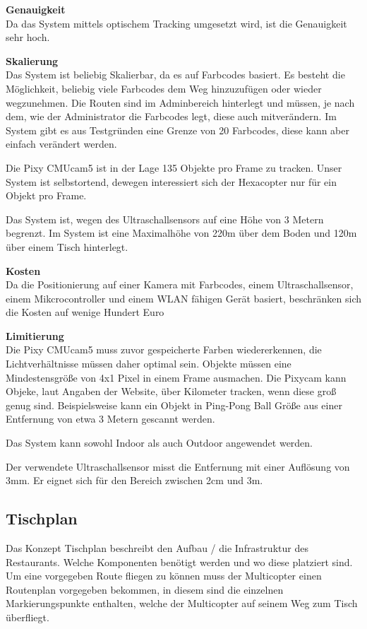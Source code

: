   \textbf{Genauigkeit}\\
  Da das System mittels optischem Tracking umgesetzt wird, ist die Genauigkeit sehr hoch.

  \textbf{Skalierung}\\
  Das System ist beliebig Skalierbar, da es auf Farbcodes basiert. Es besteht die Möglichkeit, beliebig viele Farbcodes dem Weg hinzuzufügen oder wieder wegzunehmen. Die Routen sind im Adminbereich hinterlegt und müssen, je nach dem, wie der Administrator die Farbcodes legt, diese auch mitverändern. Im System gibt es aus Testgründen eine Grenze von 20 Farbcodes, diese kann aber einfach verändert werden.

  Die Pixy CMUcam5 ist in der Lage 135 Objekte pro Frame zu tracken. Unser System ist selbstortend, dewegen interessiert sich der Hexacopter nur für ein Objekt pro Frame. \cite{PIXY_Porting_Examplecode}

  Das System ist, wegen des Ultraschallsensors auf eine Höhe von 3 Metern begrenzt. Im System ist eine Maximalhöhe von 220m über dem Boden und 120m über einem Tisch hinterlegt.

  \textbf{Kosten}\\
  Da  die Positionierung auf einer Kamera mit Farbcodes, einem Ultraschallsensor, einem Mikcrocontroller und einem WLAN fähigen Gerät basiert, beschränken sich die Kosten auf wenige Hundert Euro

  \textbf{Limitierung}\\
  Die Pixy CMUcam5 muss zuvor gespeicherte Farben wiedererkennen, die Lichtverhältnisse müssen daher optimal sein.
  Objekte müssen eine Mindestensgröße von 4x1 Pixel in einem Frame ausmachen. Die Pixycam kann Objeke, laut Angaben der Website, über Kilometer tracken, wenn diese groß genug sind. Beispielsweise kann ein Objekt in Ping-Pong Ball Größe aus einer Entfernung von etwa 3 Metern gescannt werden.
  \cite{Pixy}

  Das System kann sowohl Indoor als auch Outdoor angewendet werden.

  Der verwendete Ultraschallsensor misst die Entfernung mit einer Auflösung von 3mm. Er eignet sich für den Bereich zwischen 2cm und 3m.
  \cite{Ultrasonic}

  \subsection{Tischplan}

  Das Konzept Tischplan beschreibt den Aufbau / die Infrastruktur des Restaurants. Welche Komponenten benötigt werden und wo diese platziert sind.
  Um eine vorgegeben Route fliegen zu können muss der Multicopter einen Routenplan vorgegeben bekommen, in diesem sind die einzelnen Markierungspunkte enthalten, welche der Multicopter auf seinem Weg zum Tisch überfliegt.

